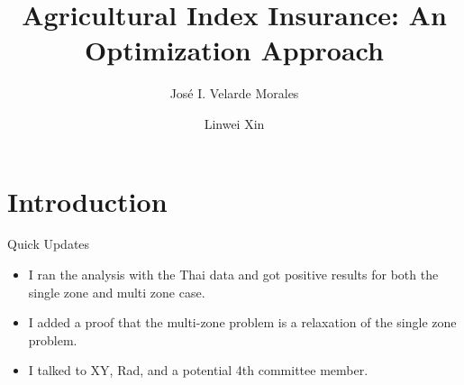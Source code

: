\documentclass{beamer}
\title[Agricultural Index Insurance]{Agricultural Index Insurance: An Optimization Approach}
\author[José Velarde Morales]{José I. Velarde Morales \and Linwei Xin}
\institute[Chicago Booth]
{

  University of Chicago\\
  Booth School of Business

}
\begin{document}
\beamertemplatenavigationsymbolsempty
\frame{\titlepage}
\section{Introduction}
\begin{frame}{Quick Updates}
    \begin{itemize}
        \setlength\itemsep{1em}
        \item I ran the analysis with the Thai data and got positive results for both the single zone and multi zone case.
        \item I added a proof that the multi-zone problem is a relaxation of the single zone problem. 
        \item I talked to XY, Rad, and a potential 4th committee member. 
    \end{itemize}
\end{frame}

   

\end{document}
